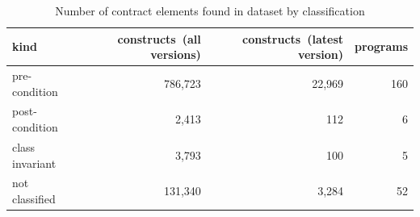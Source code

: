 \begin{table}[]
\centering
\caption{Number of contract elements found in dataset by classification}
\label{tab:contractsbyclassification}
\begin{tabular}{|p{2.1cm}|r|r|r|} \hline
   kind & constructs\ (all versions) & constructs\ (latest version) & programs \\ \hline
	pre-condition &  786,723 & 
22,969 & 
160 \\ 
	post-condition &  2,413 & 
112 & 
6 \\ 
	class invariant &  3,793 & 
100 & 
5 \\ 
	not classified &  131,340 & 
3,284 & 
52 \\ 
\hline
\end{tabular}
\end{table}
